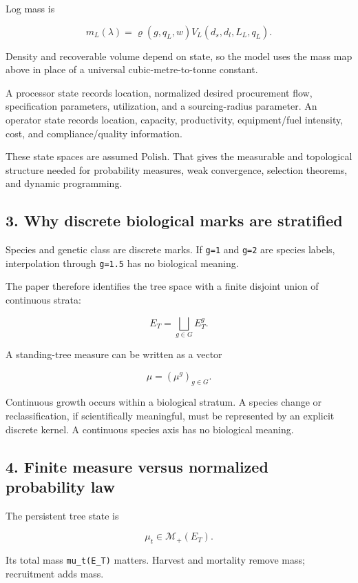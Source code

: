 Log mass is

\[
m_L(\lambda)=\varrho(g,q_L,w)V_L(d_s,d_l,L_L,q_L).
\]

Density and recoverable volume depend on state, so the model uses the mass map
above in place of a universal cubic-metre-to-tonne constant.

A processor state records location, normalized desired procurement flow,
specification parameters, utilization, and a sourcing-radius parameter. An
operator state records location, capacity, productivity, equipment/fuel
intensity, cost, and compliance/quality information.

These state spaces are assumed Polish. That gives the measurable and topological
structure needed for probability measures, weak convergence, selection theorems,
and dynamic programming.

\subsection{3. Why discrete biological marks are stratified}\label{why-discrete-biological-marks-are-stratified}

Species and genetic class are discrete marks. If
\texttt{g=1} and \texttt{g=2} are species labels, interpolation through \texttt{g=1.5} has no
biological meaning.

The paper therefore identifies the tree space with a finite disjoint union of
continuous strata:

\[
E_T=\bigsqcup_{g\in G}E_T^g.
\]

A standing-tree measure can be written as a vector

\[
\mu=(\mu^g)_{g\in G}.
\]

Continuous growth occurs within a biological stratum. A species change or
reclassification, if scientifically meaningful, must be represented by an
explicit discrete kernel. A continuous species axis has no biological meaning.

\subsection{4. Finite measure versus normalized probability law}\label{finite-measure-versus-normalized-probability-law}

The persistent tree state is

\[
\mu_t\in\mathcal M_+(E_T).
\]

Its total mass \texttt{mu\_t(E\_T)} matters. Harvest and mortality remove mass;
recruitment adds mass.

